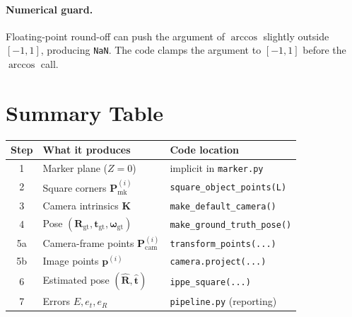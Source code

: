 \documentclass[11pt]{article}
\newcommand{\Rgt}{\mathbf{R}_{\text{gt}}}
\newcommand{\tgt}{\mathbf{t}_{\text{gt}}}
\newcommand{\wgt}{\boldsymbol{\omega}_{\text{gt}}}
\newcommand{\Pcam}{\mathbf{P}_{\text{cam}}}
\newcommand{\Pmark}{\mathbf{P}_{\text{mk}}}
\newcommand{\KK}{\mathbf{K}}
\begin{document}
\paragraph{Numerical guard.}
Floating-point round-off can push the argument of $\arccos$ slightly
outside $[-1, 1]$, producing \verb|NaN|. The code clamps the argument
to $[-1, 1]$ before the $\arccos$ call.

\section*{Summary Table}

\begin{center}
\begin{tabular}{|c|l|l|}
\hline
\textbf{Step} & \textbf{What it produces} & \textbf{Code location} \\
\hline
1   & Marker plane ($Z=0$)                       & implicit in \texttt{marker.py} \\
2   & Square corners $\Pmark^{(i)}$              & \texttt{square\_object\_points(L)} \\
3   & Camera intrinsics $\KK$                    & \texttt{make\_default\_camera()} \\
4   & Pose $(\Rgt, \tgt, \wgt)$                  & \texttt{make\_ground\_truth\_pose()} \\
5a  & Camera-frame points $\Pcam^{(i)}$          & \texttt{transform\_points(...)} \\
5b  & Image points $\mathbf{p}^{(i)}$            & \texttt{camera.project(...)} \\
6   & Estimated pose $(\hat{\mathbf{R}}, \hat{\mathbf{t}})$ & \texttt{ippe\_square(...)} \\
7   & Errors $E, e_t, e_R$                       & \texttt{pipeline.py} (reporting) \\
\hline
\end{tabular}
\end{center}
\end{document}

